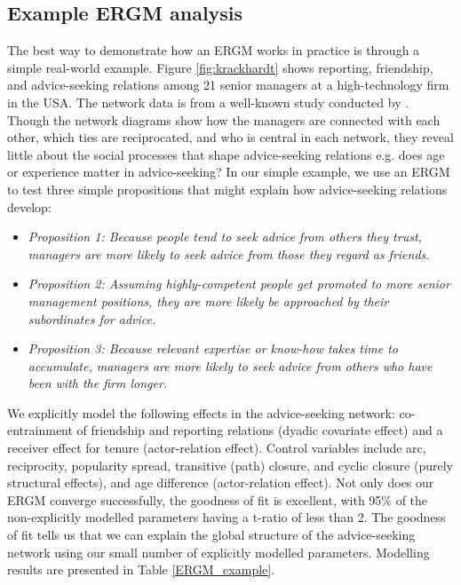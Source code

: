 \subsection{Example ERGM analysis}

The best way to demonstrate how an ERGM works in practice is through a simple real-world example. Figure \ref{fig:krackhardt} shows reporting, friendship, and advice-seeking relations among 21 senior managers at a high-technology firm in the USA. The network data is from a well-known study conducted by \citet{krackhardt1990assessing}. Though the network diagrams show how the managers are connected with each other, which ties are reciprocated, and who is central in each network, they reveal little about the social processes that shape advice-seeking relations e.g. does age or experience matter in advice-seeking? In our simple example, we use an ERGM to test three simple propositions that might explain how advice-seeking relations develop: 

\begin{itemize}[label={},leftmargin=0pt]
    \item \textit{Proposition 1: Because people tend to seek advice from others they trust, managers are more likely to seek advice from those they regard as friends.}
    \item \textit{Proposition 2: Assuming highly-competent people get promoted to more senior management positions, they are more likely be approached by their subordinates for advice.}
    \item \textit{Proposition 3: Because relevant expertise or know-how takes time to accumulate, managers are more likely to seek advice from others who have been with the firm longer.}
\end{itemize}

We explicitly model the following effects in the advice-seeking network: co-entrainment of friendship and reporting relations (dyadic covariate effect) and a receiver effect for tenure (actor-relation effect). Control variables include arc, reciprocity, popularity spread, transitive (path) closure, and cyclic closure (purely structural effects), and age difference (actor-relation effect). Not only does our ERGM converge successfully, the goodness of fit is excellent, with 95\% of the non-explicitly modelled parameters having a t-ratio of less than 2. The goodness of fit tells us that we can explain the global structure of the advice-seeking network using our small number of explicitly modelled parameters. Modelling results are presented in Table \ref{ERGM_example}.

